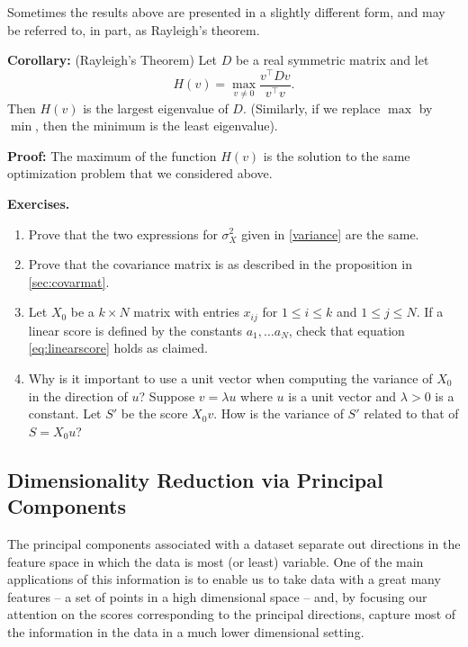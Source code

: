 \documentclass[
]{article}
\begin{document}
Sometimes the results above are presented in a slightly different form,
and may be referred to, in part, as Rayleigh's theorem.

\textbf{Corollary:} (Rayleigh's Theorem) Let \(D\) be a real symmetric
matrix and let \[
H(v) = \max_{v\not = 0}\frac{v^{\intercal}Dv}{v^{\intercal}v}.
\] Then \(H(v)\) is the largest eigenvalue of \(D\). (Similarly, if we
replace \(\max\) by \(\min\), then the minimum is the least eigenvalue).

\textbf{Proof:} The maximum of the function \(H(v)\) is the solution to
the same optimization problem that we considered above.

\textbf{Exercises.}

\begin{enumerate}
\def\labelenumi{\arabic{enumi}.}
\item
  Prove that the two expressions for \(\sigma_{X}^2\) given in
  \cref{variance} are the same.
\item
  Prove that the covariance matrix is as described in the proposition in
  \ref{sec:covarmat}.
\item
  Let \(X_{0}\) be a \(k\times N\) matrix with entries \(x_{ij}\) for
  \(1\le i\le k\) and \(1\le j\le N\). If a linear score is defined by
  the constants \(a_{1},\ldots a_{N}\), check that equation
  \cref{eq:linearscore} holds as claimed.
\item
  Why is it important to use a unit vector when computing the variance
  of \(X_{0}\) in the direction of \(u\)? Suppose \(v=\lambda u\) where
  \(u\) is a unit vector and \(\lambda>0\) is a constant. Let \(S'\) be
  the score \(X_{0}v\). How is the variance of \(S'\) related to that of
  \(S=X_{0}u\)?
\end{enumerate}

\hypertarget{dimensionality-reduction-via-principal-components}{%
\subsection{Dimensionality Reduction via Principal
Components}\label{dimensionality-reduction-via-principal-components}}

The principal components associated with a dataset separate out
directions in the feature space in which the data is most (or least)
variable. One of the main applications of this information is to enable
us to take data with a great many features -- a set of points in a high
dimensional space -- and, by focusing our attention on the scores
corresponding to the principal directions, capture most of the
information in the data in a much lower dimensional setting.
\end{document}
